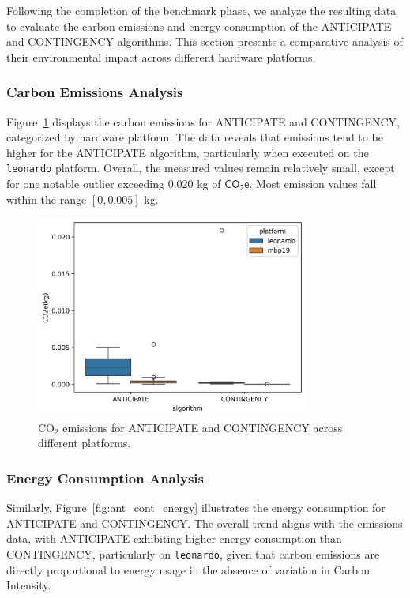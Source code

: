 \documentclass[a4paper,singleside,12pt]{report} %
\begin{document}
Following the completion of the benchmark phase, we analyze the resulting data to evaluate the carbon emissions and energy consumption of the ANTICIPATE and CONTINGENCY algorithms. This section 
presents a comparative analysis of their environmental impact across different hardware platforms.

\subsubsection{Carbon Emissions Analysis}

Figure~\ref{fig:ant_cont_emissions} displays the carbon emissions for ANTICIPATE and CONTINGENCY, categorized by hardware platform. The data reveals that emissions tend to be higher for the 
ANTICIPATE algorithm, particularly when executed on the \verb|leonardo| platform. Overall, the measured values remain relatively small, except for one notable outlier exceeding 0.020 kg of 
$\mathsf{CO_2e}$. Most emission values fall within the range $[0,0.005]$ kg.

\begin{figure}[h!]
    \centering
    \includegraphics[width=0.8\textwidth]{imgs/emissions_ant_cont.png}
    \caption{CO$_2$ emissions for ANTICIPATE and CONTINGENCY across different platforms.}
    \label{fig:ant_cont_emissions}
\end{figure}

\subsubsection{Energy Consumption Analysis}

Similarly, Figure~\ref{fig:ant_cont_energy} illustrates the energy consumption for ANTICIPATE and CONTINGENCY. The overall trend aligns with the emissions data, with ANTICIPATE exhibiting higher 
energy consumption than CONTINGENCY, particularly on \verb|leonardo|, given that carbon emissions are directly proportional to energy usage in the absence of variation in Carbon Intensity.
\end{document}
